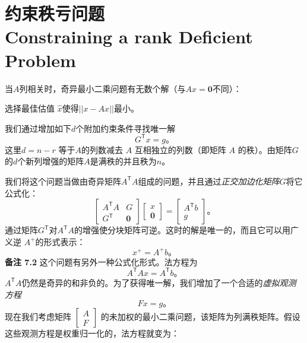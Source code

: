 \section[约束秩亏问题]{约束秩亏问题\\Constraining a rank Deficient Problem}	
\par \noindent
当$A$列相关时，奇异最小二乘问题有无数个解（与$Ax= \mathbf{0}$不同）：
\begin{center}
	选择最佳估值 $\hat{x}$使得$||{x - Ax}||$最小。
\end{center}
我们通过增加如下$d$个附加约束条件寻找唯一解
\begin{equation}
	G^\mathsf{T}x
	=g\text{。}
\end{equation}
这里$d = n - r$ 等于$A$的列数减去 $A$ 互相独立的列数（即矩阵 $A$ 的秩）。由矩阵$G$的$d$个新列增强的矩阵$A$是满秩的并且秩为$n$。
\par
我们将这个问题当做由奇异矩阵$A^\mathsf{T}A$组成的问题，并且通过\emph{正交加边化矩阵}$G$将它公式化：
\begin{equation}
	\begin{bmatrix}
		A^\mathsf{T}A & G \\
		G^\mathsf{T} & \mathbf{0}
	\end{bmatrix}
	\begin{bmatrix}
		x\\
		\mathbf{0}
	\end{bmatrix}
	=
	\begin{bmatrix}
		A^\mathsf{T}b \\ g
	\end{bmatrix}\text{。}
\end{equation}
通过矩阵$G^\mathsf{T}$对$A^\mathsf{T}A$的增强使分块矩阵可逆。这时的解是唯一的，而且它可以用广义逆 $A^\mathsf{+}$的形式表示：
\begin{equation}
	x^\mathsf{+}
	=A^\mathsf{+}b\text{。}
\end{equation}
\textbf{备注 7.2} 这个问题有另外一种公式化形式。法方程为
\begin{equation}
	A^\mathsf{T}Ax
	=A^\mathsf{T}b\text{。}
\end{equation}
$A^\mathsf{T}A$仍然是奇异的和非负的。为了获得唯一解，我们增加了一个合适的\emph{虚拟观测方程}
\begin{equation}
	Fx
	=g\text{。}
\end{equation}
现在我们考虑矩阵
$\begin{bmatrix}
A\\
F
\end{bmatrix}$
的未加权的最小二乘问题，该矩阵为列满秩矩阵。假设这些观测方程是权重归一化的，法方程就变为：
